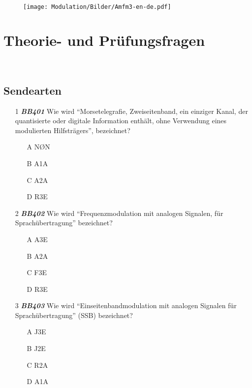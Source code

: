\begin{wrapfigure}[0]{r}[0cm]{4cm}
 \vspace{-6cm}
  \texttt{[image: Modulation/Bilder/Amfm3-en-de.pdf]}
 \vspace{-6cm}
\end{wrapfigure}

\section*{Theorie- und Prüfungsfragen}

~~~~~~

\subsection*{Sendearten}

\begin{enumerate} 
	\item[1] \emph{\textbf{BB401}}  Wie wird ``Morsetelegrafie, Zweiseitenband, ein einziger Kanal, der quantisierte oder digitale Information enthält, ohne Verwendung eines modulierten Hilfsträgers'', bezeichnet?
	\begin{enumerate}
	\itemsep1pt\parskip0pt
		\item[A] NØN
		\item[B] A1A
		\item[C] A2A
		\item[D] R3E
	\end{enumerate} 
	\item[2] \emph{\textbf{BB402}}  Wie wird ``Frequenzmodulation mit analogen Signalen, für Sprachübertragung'' bezeichnet?
	\begin{enumerate}
	\itemsep1pt\parskip0pt
		\item[A] A3E
		\item[B] A2A
		\item[C] F3E
		\item[D] R3E
	\end{enumerate} 
	\item[3] \emph{\textbf{BB403}}  Wie wird ``Einseitenbandmodulation mit analogen Signalen für Sprachübertragung'' (SSB) bezeichnet?
	\begin{enumerate}
	\itemsep1pt\parskip0pt
		\item[A] J3E
		\item[B] J2E
		\item[C] R2A
		\item[D] A1A
	\end{enumerate} 
\end{enumerate}


